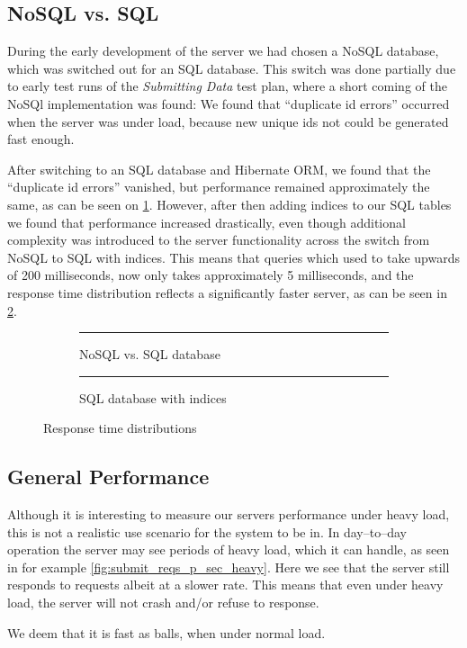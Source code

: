 \subsection{NoSQL vs. SQL}\label{subsec:nosql_vs._sql}
During the early development of the server we had chosen a NoSQL database, which was switched out for an SQL database.
This switch was done partially due to early test runs of the \textit{Submitting Data} test plan, where a short coming of the NoSQl implementation was found:
We found that \enquote{duplicate id errors} occurred when the server was under load, because new unique ids not could be generated fast enough.

After switching to an SQL database and Hibernate ORM, we found that the \enquote{duplicate id errors} vanished, but performance remained approximately the same, as can be seen on \cref{fig:same_response_sql}.
However, after then adding indices to our SQL tables we found that performance increased drastically, even though additional complexity was introduced to the server functionality across the switch from NoSQL to SQL with indices.
This means that queries which used to take upwards of 200 milliseconds, now only takes approximately 5 milliseconds, and the response time distribution reflects a significantly faster server, as can be seen in \cref{fig:fast_response_indices}.

\begin{figure}[!htb]
    \centering
    \begin{subfigure}[b]{0.5\textwidth}
        \centering
        \rule{5cm}{5cm}
        \caption{NoSQL vs. SQL database}\label{fig:same_response_sql}
    \end{subfigure}\hfill%
    \begin{subfigure}[b]{0.5\textwidth}
        \centering
        \rule{5cm}{5cm}
        \caption{SQL database with indices}\label{fig:fast_response_indices}
    \end{subfigure}
    \caption{Response time distributions}\label{fig:nosql_vs_sql}
\end{figure}

\subsection{General Performance}
Although it is interesting to measure our servers performance under heavy load, this is not a realistic use scenario for the system to be in.
In day--to--day operation the server may see periods of heavy load, which it can handle, as seen in for example \cref{fig:submit_reqs_p_sec_heavy}.
Here we see that the server still responds to requests albeit at a slower rate.
This means that even under heavy load, the server will not crash and/or refuse to response.

We deem that it is fast as balls, when under normal load.

